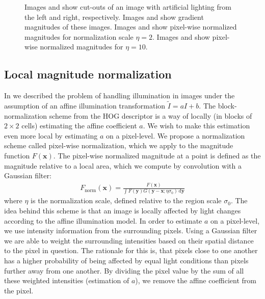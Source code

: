 \documentclass[thesis.tex]{subfiles}
\def\x{\mathbf{x}}
\def\y{\mathbf{y}}
\begin{document}
\begin{figure}[p]
\begin{subfigure}[t]{0.48\textwidth}
        \caption{}
        \label{fig:pixelNormalizationExample8}
    \end{subfigure}
    \caption{Images  and  show cut-outs of an image with artificial lighting from the left and right, respectively. Images  and  show gradient magnitudes of these images. Images  and  show pixel-wise normalized magnitudes for normalization scale $\eta = 2$. Images  and  show pixel-wise normalized magnitudes for $\eta = 10$.}
    \label{fig:pixelNormalizationExample}
\end{figure}
%
\subsection{Local magnitude normalization}
\label{sec:localMagnitudeNormalization}
%
In  we described the problem of handling illumination in images under the assumption of an affine illumination transformation $\tilde{I} = aI + b$. The block-normalization scheme from the HOG descriptor \cite{dalal2005histograms} is a way of locally (in blocks of $2 \times 2$ cells) estimating the affine coefficient $a$. We wish to make this estimation even more local by estimating $a$ on a pixel-level. We propose a normalization scheme called pixel-wise normalization, which we apply to the magnitude function $F(\x)$.
The pixel-wise normalized magnitude at a point is defined as the magnitude relative to a local area, which we compute by convolution with a Gaussian filter:
%
\begin{align}
F_\text{norm}(\x) = \frac{F(\x)}{\int F(\y) G(\y - \x; \eta \sigma_0) \,\text{d} \y}
\end{align}
%
where $\eta$ is the normalization scale, defined relative to the region scale $\sigma_0$. The idea behind this scheme is that an image is locally affected by light changes according to the affine illumination model. In order to estimate $a$ on a pixel-level, we use intensity information from the surrounding pixels. Using a Gaussian filter we are able to weight the surrounding intensities based on their spatial distance to the pixel in question. The rationale for this is, that pixels close to one another has a higher probability of being affected by equal light conditions than pixels further away from one another. By dividing the pixel value by the sum of all these weighted intensities (estimation of $a$), we remove the affine coefficient from the pixel.
\end{document}

